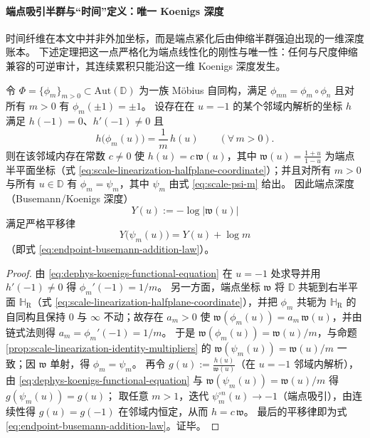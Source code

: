 \paragraph{端点吸引半群与“时间”定义：唯一 Koenigs 深度}
时间纤维在本文中并非外加坐标，而是端点紧化后由伸缩半群强迫出现的一维深度账本。
下述定理把这一点严格化为端点线性化的刚性与唯一性：任何与尺度伸缩兼容的可逆审计，其连续累积只能沿这一维 Koenigs 深度发生。

\begin{theorem}\label{thm:dephys-endpoint-koenigs-rigidity}
令 \(\Phi=\{\phi_m\}_{m>0}\subset \mathrm{Aut}(\mathbb{D})\) 为一族 Möbius 自同构，满足 \(\phi_{mn}=\phi_m\circ\phi_n\) 且对所有 \(m>0\) 有 \(\phi_m(\pm 1)=\pm 1\)。
设存在在 \(u=-1\) 的某个邻域内解析的坐标 \(h\) 满足 \(h(-1)=0\)、\(h'(-1)\neq 0\) 且
\begin{equation}\label{eq:dephys-koenigs-functional-equation}
h\bigl(\phi_m(u)\bigr)=\frac{1}{m}\,h(u)\qquad(\forall\,m>0).
\end{equation}
则在该邻域内存在常数 \(c\neq 0\) 使 \(h(u)=c\,\mathfrak{w}(u)\)，其中 \(\mathfrak{w}(u)=\frac{1+u}{1-u}\) 为端点半平面坐标（式 \eqref{eq:scale-linearization-halfplane-coordinate}）；并且对所有 \(m>0\) 与所有 \(u\in\mathbb{D}\) 有 \(\phi_m=\psi_m\)，其中 \(\psi_m\) 由式 \eqref{eq:scale-psi-m} 给出。
因此端点深度（Busemann/Koenigs 深度）
\[
Y(u):=-\log\bigl|\mathfrak{w}(u)\bigr|
\]
满足严格平移律
\[
Y\!\bigl(\psi_m(u)\bigr)=Y(u)+\log m
\]
（即式 \eqref{eq:endpoint-busemann-addition-law}）。
\end{theorem}

\begin{proof}
由 \eqref{eq:dephys-koenigs-functional-equation} 在 \(u=-1\) 处求导并用 \(h'(-1)\neq 0\) 得 \(\phi_m'(-1)=1/m\)。
另一方面，端点坐标 \(\mathfrak{w}\) 将 \(\mathbb{D}\) 共轭到右半平面 \(\mathbb{H}_{\mathrm{R}}\)（式 \eqref{eq:scale-linearization-halfplane-coordinate}），并把 \(\phi_m\) 共轭为 \(\mathbb{H}_{\mathrm{R}}\) 的自同构且保持 \(0\) 与 \(\infty\) 不动；故存在 \(a_m>0\) 使
\(
\mathfrak{w}(\phi_m(u))=a_m\,\mathfrak{w}(u)
\)，并由链式法则得 \(a_m=\phi_m'(-1)=1/m\)。
于是 \(\mathfrak{w}(\phi_m(u))=\mathfrak{w}(u)/m\)，与命题 \ref{prop:scale-linearization-identity-multipliers} 的 \(\mathfrak{w}(\psi_m(u))=\mathfrak{w}(u)/m\) 一致；因 \(\mathfrak{w}\) 单射，得 \(\phi_m=\psi_m\)。
再令 \(g(u):=\frac{h(u)}{\mathfrak{w}(u)}\)（在 \(u=-1\) 邻域内解析），由 \eqref{eq:dephys-koenigs-functional-equation} 与 \(\mathfrak{w}(\psi_m(u))=\mathfrak{w}(u)/m\) 得 \(g(\psi_m(u))=g(u)\)；
取任意 \(m>1\)，迭代 \(\psi_m^{\circ n}(u)\to-1\)（端点吸引），由连续性得 \(g(u)=g(-1)\) 在邻域内恒定，从而 \(h=c\,\mathfrak{w}\)。
最后的平移律即为式 \eqref{eq:endpoint-busemann-addition-law}。证毕。
\end{proof}

